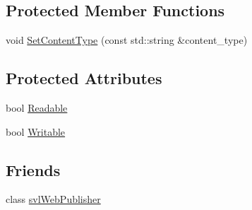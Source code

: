 \subsection*{Protected Member Functions}
\begin{DoxyCompactItemize}
\item 
void \hyperlink{classsvl_web_object_base_ac2a00bf973c7823663fe0f11a8561d70}{Set\-Content\-Type} (const std\-::string \&content\-\_\-type)
\end{DoxyCompactItemize}
\subsection*{Protected Attributes}
\begin{DoxyCompactItemize}
\item 
bool \hyperlink{classsvl_web_object_base_a6e60e80b45caae93a766426f7aa13124}{Readable}
\item 
bool \hyperlink{classsvl_web_object_base_a515395da928c86641270ece2ab7c1188}{Writable}
\end{DoxyCompactItemize}
\subsection*{Friends}
\begin{DoxyCompactItemize}
\item 
class \hyperlink{classsvl_web_object_base_a5da5a059398f07bd737af2dae959acfa}{svl\-Web\-Publisher}
\end{DoxyCompactItemize}


